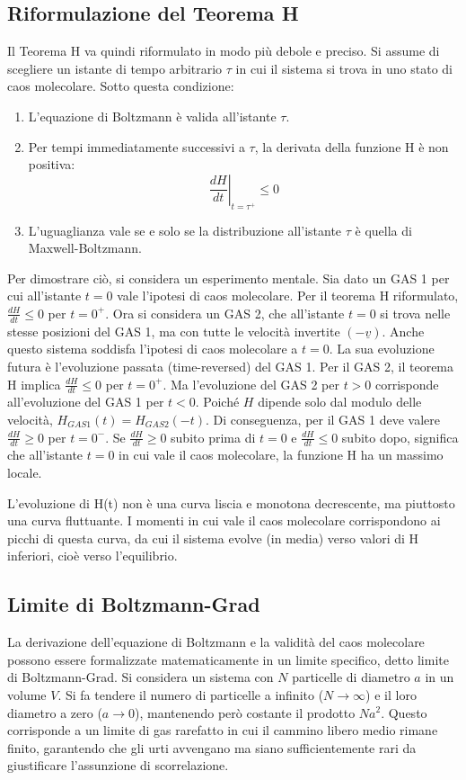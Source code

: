 \subsection{Riformulazione del Teorema H}
Il Teorema H va quindi riformulato in modo più debole e preciso.
Si assume di scegliere un istante di tempo arbitrario $\tau$ in cui il sistema si trova in uno stato di caos molecolare. Sotto questa condizione:
\begin{enumerate}
    \item L'equazione di Boltzmann è valida all'istante $\tau$.
    \item Per tempi immediatamente successivi a $\tau$, la derivata della funzione H è non positiva:
    \begin{equation}
    \left. \frac{dH}{dt} \right|_{t=\tau^+} \le 0
    \end{equation}
    \item L'uguaglianza vale se e solo se la distribuzione all'istante $\tau$ è quella di Maxwell-Boltzmann.
\end{enumerate}
Per dimostrare ciò, si considera un esperimento mentale. Sia dato un GAS 1 per cui all'istante $t=0$ vale l'ipotesi di caos molecolare. Per il teorema H riformulato, $\frac{dH}{dt} \le 0$ per $t=0^+$.
Ora si considera un GAS 2, che all'istante $t=0$ si trova nelle stesse posizioni del GAS 1, ma con tutte le velocità invertite $(-\underline{v})$. Anche questo sistema soddisfa l'ipotesi di caos molecolare a $t=0$. La sua evoluzione futura è l'evoluzione passata (time-reversed) del GAS 1. Per il GAS 2, il teorema H implica $\frac{dH}{dt} \le 0$ per $t=0^+$. Ma l'evoluzione del GAS 2 per $t>0$ corrisponde all'evoluzione del GAS 1 per $t<0$. Poiché $H$ dipende solo dal modulo delle velocità, $H_{GAS1}(t) = H_{GAS2}(-t)$.
Di conseguenza, per il GAS 1 deve valere $\frac{dH}{dt} \ge 0$ per $t=0^-$.
Se $\frac{dH}{dt} \ge 0$ subito prima di $t=0$ e $\frac{dH}{dt} \le 0$ subito dopo, significa che all'istante $t=0$ in cui vale il caos molecolare, la funzione H ha un massimo locale.

L'evoluzione di H(t) non è una curva liscia e monotona decrescente, ma piuttosto una curva fluttuante. I momenti in cui vale il caos molecolare corrispondono ai picchi di questa curva, da cui il sistema evolve (in media) verso valori di H inferiori, cioè verso l'equilibrio.

\subsection{Limite di Boltzmann-Grad}
La derivazione dell'equazione di Boltzmann e la validità del caos molecolare possono essere formalizzate matematicamente in un limite specifico, detto limite di Boltzmann-Grad. Si considera un sistema con $N$ particelle di diametro $a$ in un volume $V$. Si fa tendere il numero di particelle a infinito ($N \to \infty$) e il loro diametro a zero ($a \to 0$), mantenendo però costante il prodotto $N a^2$. Questo corrisponde a un limite di gas rarefatto in cui il cammino libero medio rimane finito, garantendo che gli urti avvengano ma siano sufficientemente rari da giustificare l'assunzione di scorrelazione.

